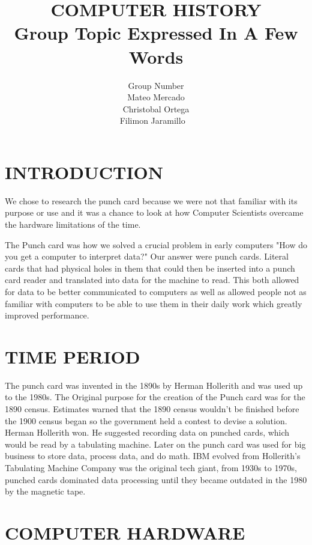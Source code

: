 \documentclass[letterpaper, 10 pt, conference]{IEEEconf}
\title{\LARGE \bf
COMPUTER HISTORY\\
\large Group Topic Expressed In A Few Words
}
\author{Group Number\\
\small Mateo Mercado\\
\small Christobal Ortega\\
\small Filimon Jaramillo \
}
\begin{document}
\maketitle
\thispagestyle{empty}
\pagestyle{empty}



\section{INTRODUCTION}
We chose to research the punch card because we were not that familiar with its purpose or use and it was a chance to look at how Computer Scientists overcame the hardware limitations of the time.

The Punch card was how we solved a crucial problem in early computers "How do you get a computer to interpret data?" Our answer were punch cards. Literal cards that had physical holes in them that could then be inserted into a punch card reader and translated into data for the machine to read. This both allowed for data to be better communicated to computers as well as allowed people not as familiar with computers to be able to use them in their daily work which greatly improved performance. 

\section{TIME PERIOD}

The punch card was invented in the 1890s by Herman Hollerith and was used up to the 1980s.
The Original purpose for the creation of the Punch card was for the 1890 census. Estimates warned that the 1890 census wouldn't be finished before the 1900 census began so the government held a contest to devise a solution. Herman Hollerith won. He suggested recording data on punched cards, which would be read by a tabulating machine. Later on the punch card was used for big business to store data, process data, and do math. IBM evolved from Hollerith’s Tabulating Machine Company was the original tech giant, from 1930s to 1970s, punched cards dominated data processing until they became outdated in the 1980 by the magnetic tape.


\newpage
\section{COMPUTER HARDWARE}
\end{document}
